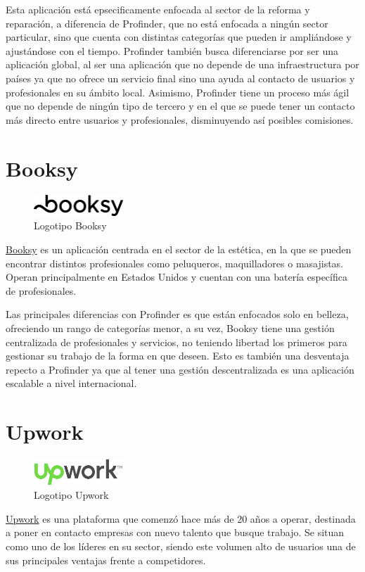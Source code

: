 Esta aplicación está epsecificamente enfocada al sector de la reforma y reparación, a diferencia de Profinder, que no está enfocada a ningún sector particular, sino que cuenta con distintas categorías que pueden ir ampliándose y ajustándose con el tiempo. Profinder también busca diferenciarse por ser una aplicación global, al ser una aplicación que no depende de una infraestructura por países ya que no ofrece un servicio final sino una ayuda al contacto de usuarios y profesionales en su ámbito local. Asimismo, Profinder tiene un proceso más ágil que no depende de ningún tipo de tercero y en el que se puede tener un contacto más directo entre usuarios y profesionales, disminuyendo así posibles comisiones.
\section{Booksy}
\begin{figure}[h]
	\centering
	\includegraphics[width = 0.3\textwidth]{Imagenes/Fuentes/logo_booksy.png}
	\caption{Logotipo Booksy}
	\label{fig:booksy_logo}
\end{figure}
\href{https://booksy.com/en-us}{Booksy} es un aplicación centrada en el sector de la estética, en la que se pueden encontrar distintos profesionales como peluqueros, maquilladores o masajistas. Operan principalmente en Estados Unidos y cuentan con una batería específica de profesionales.

Las principales diferencias con Profinder es que están enfocados solo en belleza, ofreciendo un rango de categorías menor, a su vez, Booksy tiene una gestión centralizada de profesionales y servicios, no teniendo libertad los primeros para gestionar su trabajo de la forma en que deseen. Esto es también una desventaja repecto a Profinder ya que al tener una gestión descentralizada es una aplicación escalable a nivel internacional. 
\newpage
\section{Upwork}
\begin{figure}[h]
	\centering
	\includegraphics[width = 0.3\textwidth]{Imagenes/Fuentes/logo_upwork.png}
	\caption{Logotipo Upwork}
	\label{fig:upwork_logo}
\end{figure}
\href{https://www.upwork.com}{Upwork} es una plataforma que comenzó hace más de 20 años a operar, destinada a poner en contacto empresas con nuevo talento que busque trabajo. Se situan como uno de los líderes en su sector, siendo este volumen alto de usuarios una de sus principales ventajas frente a competidores.

